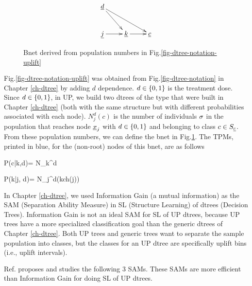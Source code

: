 \begin{figure}
$$
\xymatrix{
\rvd\ar[dr]\ar[drr]
\\
\rvj
\ar[r]
&
\rvk\ar[r]
&
\rvc
}$$
\caption{Bnet derived from population
numbers in Fig.\ref{fig-dtree-notation-uplift}}
\label{fig-class-bnet-uplift}
\end{figure}



Fig.\ref{fig-dtree-notation-uplift}
was obtained from Fig.\ref{fig-dtree-notation}
in Chapter \ref{ch-dtree}
by adding $d$ dependence.
$d\in \{0,1\}$
is the treatment dose.
Since $d\in \{0,1\}$,
in UP, we build two dtrees
of the type that were built
in Chapter \ref{ch-dtree}
(both with the same structure
but with different 
probabilities associated with each 
node).
$N^d_j(c)$ is 
the number
of individuals $\sigma$
in the population that reaches node ${\underline{x}}_j$
with $d\in \{0,1\}$ and belonging
to class $c\in S_{\underline{c}}$. 
From these population numbers, we can define
the bnet in Fig.\ref{fig-class-bnet-uplift}.
The TPMs, printed in blue,
for the (non-root) nodes of this bnet, are as follows



\beq\color{blue}
P(c|k,d)=
{N_k^d}
\label{eq-p-c-pre-laplace}
\eeq

\beq\color{blue}
P(k|j, d)=
{N_j^d}\indi(k\in ch(j))
\eeq


In Chapter
\ref{ch-dtree},
we used Information 
Gain
(a mutual information)
as the SAM (Separation Ability Measure)
in
SL (Structure Learning) 
of dtrees (Decision Trees).
Information Gain
is not an ideal
SAM for SL of UP dtrees,
because UP trees
have a more
specialized classification goal
than the generic dtrees of Chapter \ref{ch-dtree}.
Both UP trees and generic trees
want to
separate the sample
population into classes,
but the classes for an UP dtree 
are specifically uplift bins (i.e., uplift intervals).


Ref.\cite{jaros}
proposes and studies 
the following
3 SAMs. These SAMs 
are more efficient than
Information Gain
for doing SL of UP dtrees.


